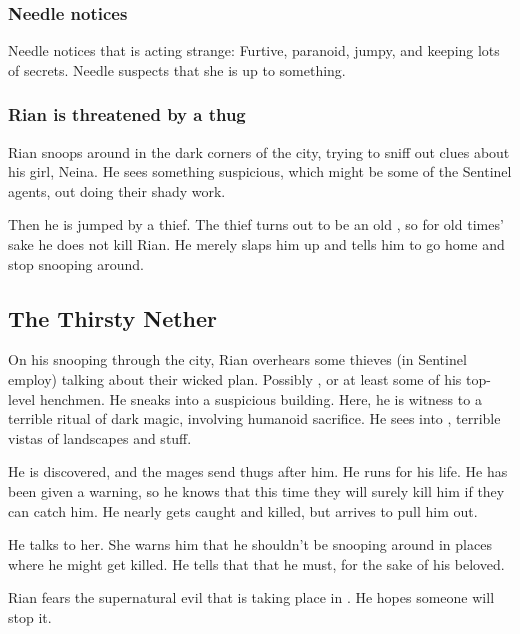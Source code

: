 \subsubsection{Needle notices \Tiroco}
Needle notices that \Tiroco{} is acting strange: 
Furtive, paranoid, jumpy, and keeping lots of secrets. 
Needle suspects that she is up to something. 






\subsubsection{Rian is threatened by a thug}
Rian snoops around in the dark corners of the city, trying to sniff out clues about his girl, Neina. 
He sees something suspicious, 
which might be some of the Sentinel agents, out doing their shady work. 

Then he is jumped by a thief. The thief turns out to be an old , so for old times' sake he does not kill Rian. He merely slaps him up and tells him to go home and stop snooping around. 









\subsection{The Thirsty Nether}
On his snooping through the city, Rian overhears some thieves (in Sentinel employ) talking about their wicked plan. 
Possibly \Psyrex{}, or at least some of his top-level henchmen. 
He sneaks into a suspicious building. 
Here, he is witness to a terrible ritual of dark magic, involving humanoid sacrifice. 
He sees into \Machai, terrible vistas of \daemonic{} landscapes and stuff. 

He is discovered, and the mages send thugs after him. 
He runs for his life. 
He has been given a warning, so he knows that this time they will surely kill him if they can catch him. 
He nearly gets caught and killed, but \MoroCobrel{} arrives to pull him out. 

He talks to her. She warns him that he shouldn't be snooping around in places where he might get killed. He tells that that he must, for the sake of his beloved. 

Rian fears the supernatural evil that is taking place in \Malcur. 
He hopes someone will stop it. 





